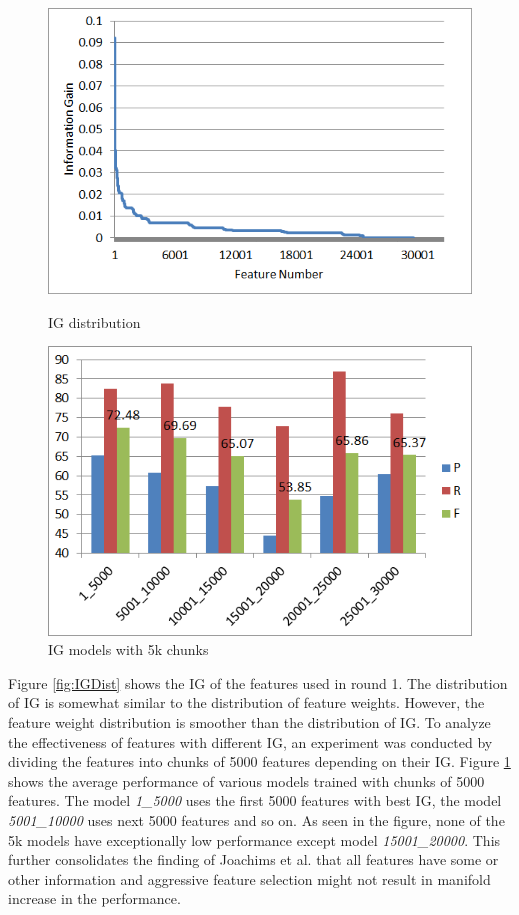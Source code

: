 \begin{figure}
\centering
\begin{minipage}{.5\textwidth}
  \centering
  \includegraphics[width=.95\textwidth]{figures/IGDistr1.png}
  \caption{IG distribution}
  \label{fig:IGDist}
\end{minipage}%
\begin{minipage}{.5\textwidth}
  \centering
  \includegraphics[width=.95\textwidth]{figures/IG5kSlabsComp.png}
  \caption{IG models with 5k chunks}
  \label{fig:IG5kComp}
\end{minipage}
\end{figure}

Figure \ref{fig:IGDist} shows the IG of the features used in round 1. The distribution of IG is somewhat similar to the distribution of feature weights. However, the feature weight distribution is smoother than the distribution of IG. To analyze the effectiveness of features with different IG, an experiment was conducted by dividing the features into chunks of 5000 features depending on their IG. Figure \ref{fig:IG5kComp} shows the average performance of various models trained with chunks of 5000 features. The model \textit{1\_5000} uses the first 5000 features with best IG, the model \textit{5001\_10000} uses next 5000 features and so on. As seen in the figure, none of the 5k models have exceptionally low performance except model \textit{15001\_20000}. This further consolidates the finding of Joachims et al. \cite{joachims1998text} that all features have some or other information and aggressive feature selection might not result in manifold increase in the performance.

